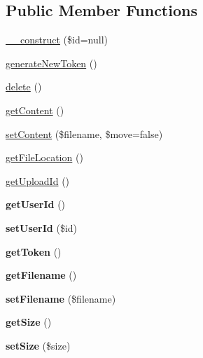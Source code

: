 \subsection*{Public Member Functions}
\begin{DoxyCompactItemize}
\item 
\hyperlink{classUpload_afba84940efd09dcba276b0bceee05f4d}{\_\-\_\-construct} (\$id=null)
\item 
\hyperlink{classUpload_aa3446f1e1b5e1153eec2f26f11bd484e}{generateNewToken} ()
\item 
\hyperlink{classUpload_a5e10f0433b44a7e78f5c2232e3d71aa4}{delete} ()
\item 
\hyperlink{classUpload_a8e8a7b44008c246f9cb524d20848d6c1}{getContent} ()
\item 
\hyperlink{classUpload_a4a6ec727bce54cbe5e60ad19963f4cb4}{setContent} (\$filename, \$move=false)
\item 
\hyperlink{classUpload_aae7c62490598d9dafc488bb9551920b6}{getFileLocation} ()
\item 
\hyperlink{classUpload_aaf7fe1fb2d650ebd9e8a28354d1b23bc}{getUploadId} ()
\item 
\hypertarget{classUpload_aa88e400fdb6da130154a50a03ffcf4fd}{
{\bfseries getUserId} ()}
\label{classUpload_aa88e400fdb6da130154a50a03ffcf4fd}

\item 
\hypertarget{classUpload_a8ee6187abde475afc6bd449317cd8140}{
{\bfseries setUserId} (\$id)}
\label{classUpload_a8ee6187abde475afc6bd449317cd8140}

\item 
\hypertarget{classUpload_af626285758a98e7a63e0aa19dac3ea56}{
{\bfseries getToken} ()}
\label{classUpload_af626285758a98e7a63e0aa19dac3ea56}

\item 
\hypertarget{classUpload_ab9b2fcbe4e5f7214705aef920b26ca5c}{
{\bfseries getFilename} ()}
\label{classUpload_ab9b2fcbe4e5f7214705aef920b26ca5c}

\item 
\hypertarget{classUpload_ab365d84030916cc79ba12b0b1a6b33bf}{
{\bfseries setFilename} (\$filename)}
\label{classUpload_ab365d84030916cc79ba12b0b1a6b33bf}

\item 
\hypertarget{classUpload_ae02afc63dbd24767d5f48caeaa4ebc2d}{
{\bfseries getSize} ()}
\label{classUpload_ae02afc63dbd24767d5f48caeaa4ebc2d}

\item 
\hypertarget{classUpload_a20826cd2af3bc00e5d1e5e19338532c9}{
{\bfseries setSize} (\$size)}
\label{classUpload_a20826cd2af3bc00e5d1e5e19338532c9}


\end{DoxyCompactItemize}
